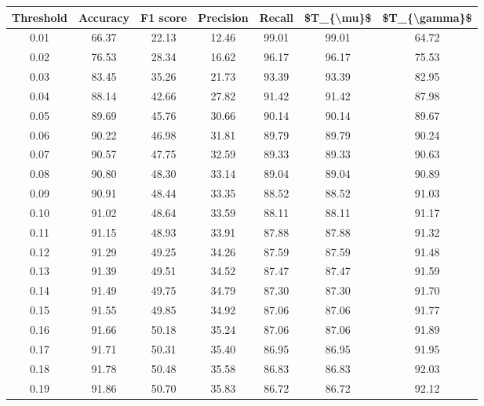 \begin{tabular}{|c|c|c|c|c|c|c|}
\toprule
 Threshold &  Accuracy &  F1 score &  Precision &  Recall &  \$T\_\{\textbackslash mu\}\$ &  \$T\_\{\textbackslash gamma\}\$ \\
\hline
      0.01 &     66.37 &     22.13 &      12.46 &   99.01 &      99.01 &         64.72 \\
      0.02 &     76.53 &     28.34 &      16.62 &   96.17 &      96.17 &         75.53 \\
      0.03 &     83.45 &     35.26 &      21.73 &   93.39 &      93.39 &         82.95 \\
      0.04 &     88.14 &     42.66 &      27.82 &   91.42 &      91.42 &         87.98 \\
      0.05 &     89.69 &     45.76 &      30.66 &   90.14 &      90.14 &         89.67 \\
      0.06 &     90.22 &     46.98 &      31.81 &   89.79 &      89.79 &         90.24 \\
      0.07 &     90.57 &     47.75 &      32.59 &   89.33 &      89.33 &         90.63 \\
      0.08 &     90.80 &     48.30 &      33.14 &   89.04 &      89.04 &         90.89 \\
      0.09 &     90.91 &     48.44 &      33.35 &   88.52 &      88.52 &         91.03 \\
      0.10 &     91.02 &     48.64 &      33.59 &   88.11 &      88.11 &         91.17 \\
      0.11 &     91.15 &     48.93 &      33.91 &   87.88 &      87.88 &         91.32 \\
      0.12 &     91.29 &     49.25 &      34.26 &   87.59 &      87.59 &         91.48 \\
      0.13 &     91.39 &     49.51 &      34.52 &   87.47 &      87.47 &         91.59 \\
      0.14 &     91.49 &     49.75 &      34.79 &   87.30 &      87.30 &         91.70 \\
      0.15 &     91.55 &     49.85 &      34.92 &   87.06 &      87.06 &         91.77 \\
      0.16 &     91.66 &     50.18 &      35.24 &   87.06 &      87.06 &         91.89 \\
      0.17 &     91.71 &     50.31 &      35.40 &   86.95 &      86.95 &         91.95 \\
      0.18 &     91.78 &     50.48 &      35.58 &   86.83 &      86.83 &         92.03 \\
      0.19 &     91.86 &     50.70 &      35.83 &   86.72 &      86.72 &         92.12 \\

\end{tabular}
